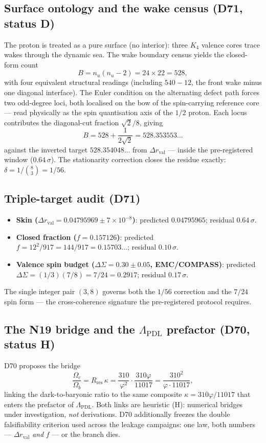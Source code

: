 \documentclass[11pt,a4paper]{article}
\theoremstyle{plain}
\theoremstyle{definition}
\theoremstyle{remark}
\begin{document}
\subsection{Surface ontology and the wake census (D71, status D)}
The proton is treated as a pure surface (no interior): three $K_{4}$ valence cores trace wakes through the dynamic sea. The wake boundary census yields the closed-form count
\[ B=n_{u}(n_{u}-2)=24\times22=528, \]
with four equivalent structural readings (including $540-12$, the front wake minus one diagonal interface). The Euler condition on the alternating defect path forces two odd-degree loci, both localised on the bow of the spin-carrying reference core --- read physically as the spin quantisation axis of the $1/2$ proton. Each locus contributes the diagonal-cut fraction $\sqrt{2}/8$, giving
\[ B=528+\frac{1}{2\sqrt{2}}=528.353553\ldots \]
against the inverted target $528.354048\ldots$ from $\Delta r_{\mathrm{val}}$ --- inside the pre-registered window ($0.64\,\sigma$). The stationarity correction closes the residue exactly: $\delta=1/\binom{8}{3}=1/56$.

\subsection{Triple-target audit (D71)}
\begin{itemize}
\item \textbf{Skin ($\Delta r_{\mathrm{val}}=0.04795969\pm7\times10^{-8}$)}: predicted $0.04795965$; residual $0.64\,\sigma$.
\item \textbf{Closed fraction ($f=0.157126$)}: predicted $f=12^{2}/917=144/917=0.15703\ldots$; residual $0.10\,\sigma$.
\item \textbf{Valence spin budget ($\Delta\Sigma=0.30\pm0.05$, EMC/COMPASS)}: predicted $\Delta\Sigma=(1/3)(7/8)=7/24=0.2917$; residual $0.17\,\sigma$.
\end{itemize}
The single integer pair $(3,8)$ governs both the $1/56$ correction and the $7/24$ spin form --- the cross-coherence signature the pre-registered protocol requires.

\subsection{The N19 bridge and the $\Lambda_{\mathrm{PDL}}$ prefactor (D70, status H)}
D70 proposes the bridge
\[ \frac{\Omega_{c}}{\Omega_{b}}=R_{\mathrm{res}}\,\kappa=\frac{310}{\varphi^{2}}\cdot\frac{310\varphi}{11017}=\frac{310^{2}}{\varphi\cdot11017}, \]
linking the dark-to-baryonic ratio to the same composite $\kappa=310\varphi/11017$ that enters the prefactor of $\Lambda_{\mathrm{PDL}}$. Both links are \textcolor{hypothesisorange}{heuristic (H)}: numerical bridges under investigation, \emph{not} derivations. D70 additionally freezes the double falsifiability criterion used across the leakage campaigns: one law, both numbers --- $\Delta r_{\mathrm{val}}$ \emph{and} $f$ --- or the branch dies.
\end{document}
